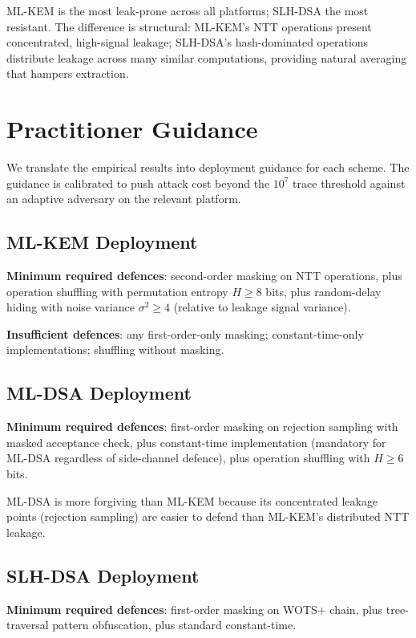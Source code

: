 \documentclass[sigconf,nonacm]{acmart}
\begin{document}
ML-KEM is the most leak-prone across all platforms; SLH-DSA the most
resistant. The difference is structural: ML-KEM's NTT operations
present concentrated, high-signal leakage; SLH-DSA's hash-dominated
operations distribute leakage across many similar computations,
providing natural averaging that hampers extraction.

\section{Practitioner Guidance}

We translate the empirical results into deployment guidance for
each scheme. The guidance is calibrated to push attack cost
beyond the $10^7$ trace threshold against an adaptive adversary on
the relevant platform.

\subsection{ML-KEM Deployment}

\textbf{Minimum required defences}: second-order masking on NTT
operations, plus operation shuffling with permutation entropy
$H \geq 8$ bits, plus random-delay hiding with noise variance
$\sigma^2 \geq 4$ (relative to leakage signal variance).

\textbf{Insufficient defences}: any first-order-only masking;
constant-time-only implementations; shuffling without masking.

\subsection{ML-DSA Deployment}

\textbf{Minimum required defences}: first-order masking on rejection
sampling with masked acceptance check, plus constant-time
implementation (mandatory for ML-DSA regardless of side-channel
defence), plus operation shuffling with $H \geq 6$ bits.

ML-DSA is more forgiving than ML-KEM because its concentrated leakage
points (rejection sampling) are easier to defend than ML-KEM's
distributed NTT leakage.

\subsection{SLH-DSA Deployment}

\textbf{Minimum required defences}: first-order masking on WOTS+ chain,
plus tree-traversal pattern obfuscation, plus standard constant-time.
\end{document}
